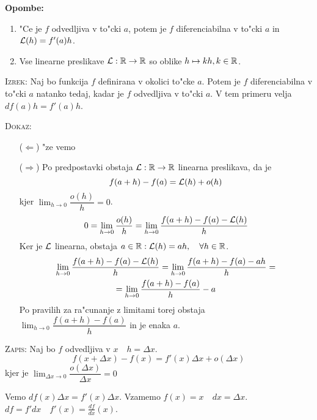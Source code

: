 \textbf{Opombe:}
\begin{enumerate}
	\item "Ce je $f$ odvedljiva v to"cki $a$, potem je $f$ diferenciabilna v to"cki $a$ in $\operatorname{\mathcal{L}}(h) = f'(a)h$.
	\item Vse linearne preslikave $\operatorname{\mathcal{L}}: \mathbb{R} \to \mathbb{R}$ so oblike $h \mapsto kh, k \in \mathbb{R}$.
\end{enumerate}
%
\textsc{Izrek:} Naj bo funkcija $f$ definirana v okolici to"cke $a$. Potem je $f$ diferenciabilna v to"cki $a$ natanko tedaj, kadar je $f$ odvedljiva v to"cki $a$. V tem primeru velja $df(a)h = f'(a)h$.

\textsc{Dokaz:}
\begin{itemize}
	\item[($\Leftarrow$)] "ze vemo
	\item[($\Rightarrow$)] Po predpostavki obstaja $\operatorname{\mathcal{L}}: \mathbb{R} \to \mathbb{R}$ linearna preslikava, da je
	\begin{equation*}
	f(a+h) - f(a) = \operatorname{\mathcal{L}}(h) + o(h)
	\end{equation*}
	kjer $\lim_{h \to 0} \dfrac{o(h)}{h} = 0$.
	\begin{equation*}
	0 = \lim_{h \to 0} \dfrac{o(h)}{h} = \lim_{h \to 0} \dfrac{f(a+h) - f(a) - \operatorname{\mathcal{L}}(h)}{h}
	\end{equation*}
	Ker je $\operatorname{\mathcal{L}}$ linearna, obstaja $a \in \mathbb{R}: \operatorname{\mathcal{L}}(h) = ah, \quad \forall h \in \mathbb{R}$.
	\begin{multline*}
	\lim_{h \to 0} \dfrac{f(a+h) - f(a) - \operatorname{\mathcal{L}}(h)}{h} = \lim_{h \to 0} \dfrac{f(a+h) - f(a) - ah}{h} =\\
	= \lim_{h \to 0} \dfrac{f(a+h) - f(a)}{h} - a
	\end{multline*}
	Po pravilih za ra"cunanje z limitami torej obstaja $\lim_{h \to 0} \dfrac{f(a +h) - f(a)}{h}$ in je enaka $a$.
\end{itemize}
\textsc{Zapis:} Naj bo $f$ odvedljiva v $x \quad h = \Delta x$.
\begin{equation*}
f(x + \Delta x) - f(x) = f'(x) \Delta x + o(\Delta x)
\end{equation*}
kjer je $\lim_{\Delta x \to 0} \dfrac{o(\Delta x)}{\Delta x} = 0$

Vemo $df(x) \Delta x = f'(x) \Delta x$. Vzamemo $f(x)= x \quad dx = \Delta x$. $df = f' dx \quad f'(x) = \frac{df}{dx} (x)$.
%
